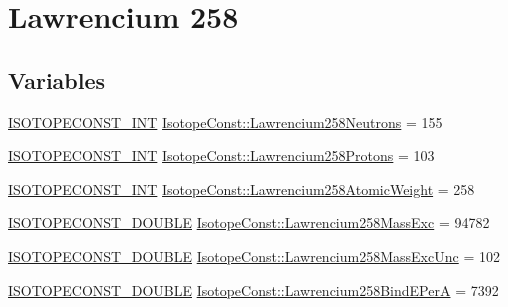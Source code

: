 \hypertarget{group___isotope_const-_lawrencium-_lr258}{}\section{Lawrencium 258}
\label{group___isotope_const-_lawrencium-_lr258}
\subsection*{Variables}
\begin{DoxyCompactItemize}
\item 
\mbox{\hyperlink{group___isotope_const-_macros_ga5f18360b3e99483a35c32d789e62621c}{I\+S\+O\+T\+O\+P\+E\+C\+O\+N\+S\+T\+\_\+\+I\+NT}} \mbox{\hyperlink{group___isotope_const-_lawrencium-_lr258_gac40644ea918878426509981029f5450d}{Isotope\+Const\+::\+Lawrencium258\+Neutrons}} = 155
\item 
\mbox{\hyperlink{group___isotope_const-_macros_ga5f18360b3e99483a35c32d789e62621c}{I\+S\+O\+T\+O\+P\+E\+C\+O\+N\+S\+T\+\_\+\+I\+NT}} \mbox{\hyperlink{group___isotope_const-_lawrencium-_lr258_ga26858222b9d1207ae115beaff3a475b7}{Isotope\+Const\+::\+Lawrencium258\+Protons}} = 103
\item 
\mbox{\hyperlink{group___isotope_const-_macros_ga5f18360b3e99483a35c32d789e62621c}{I\+S\+O\+T\+O\+P\+E\+C\+O\+N\+S\+T\+\_\+\+I\+NT}} \mbox{\hyperlink{group___isotope_const-_lawrencium-_lr258_gadd4a271007a53e19d7db9d9133d070d6}{Isotope\+Const\+::\+Lawrencium258\+Atomic\+Weight}} = 258
\item 
\mbox{\hyperlink{group___isotope_const-_macros_ga8f45a7272ce02c0b4c65c44636ed719a}{I\+S\+O\+T\+O\+P\+E\+C\+O\+N\+S\+T\+\_\+\+D\+O\+U\+B\+LE}} \mbox{\hyperlink{group___isotope_const-_lawrencium-_lr258_gae055d5efc5999215947c37af639dd874}{Isotope\+Const\+::\+Lawrencium258\+Mass\+Exc}} = 94782
\item 
\mbox{\hyperlink{group___isotope_const-_macros_ga8f45a7272ce02c0b4c65c44636ed719a}{I\+S\+O\+T\+O\+P\+E\+C\+O\+N\+S\+T\+\_\+\+D\+O\+U\+B\+LE}} \mbox{\hyperlink{group___isotope_const-_lawrencium-_lr258_ga6e2d2ec0901e18663c41d2918178a148}{Isotope\+Const\+::\+Lawrencium258\+Mass\+Exc\+Unc}} = 102
\item 
\mbox{\hyperlink{group___isotope_const-_macros_ga8f45a7272ce02c0b4c65c44636ed719a}{I\+S\+O\+T\+O\+P\+E\+C\+O\+N\+S\+T\+\_\+\+D\+O\+U\+B\+LE}} \mbox{\hyperlink{group___isotope_const-_lawrencium-_lr258_ga78cfde258d082d4011ca42f1f4ebea7f}{Isotope\+Const\+::\+Lawrencium258\+Bind\+E\+PerA}} = 7392
\item 

\end{DoxyCompactItemize}
